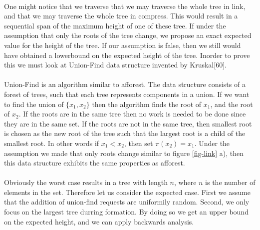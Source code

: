 \documentclass[]{article}
\begin{document}
 \paragraph{}
 One might notice that we traverse that we may traverse the whole tree in link, and that we may traverse the whole tree in compress.
 This would result in a sequential span of the maximum height of one of these tree. If under the assumption that only the roots of the tree change, we propose an exact expected value for the height of the tree. If our assumption is false, then we still would have obtained a lowerbound on the expected height of the tree. Inorder to prove this we must look at Union-Find data structure invented by Kruskal[60].
 
 \paragraph{}
 Union-Find is an algorithm similar to afforest. The data structure consists of a forest of trees, such that each tree represents components in a union. If we want to find the union of $\{x_1,x_2\}$ then the algorithm finds the root of $x_1$, and the root of $x_2$.
 If the roots are in the same tree then no work is needed to be done since they are in the same set. If the roots are not in the same tree, then smallest root is chosen as the new root of the tree such that the largest root is a child of the smallest root. In other words if $x_1 < x_2$, then set $\pi(x_2) = x_1$. Under the assumption we made that only roots change similar to figure \ref{fig-link} a), then this data structure exhibits the same properties as afforest.
 
 \paragraph{}
 Obviously the worst case results in a tree with length $n$, where $n$ is the number of elements in the set. Therefore let us consider the expected case. First we assume that the addition of union-find requests are uniformily random. Second, we only focus on the largest tree durring formation. By doing so we get an upper bound on the expected height, and we can apply backwards analysis. 
\end{document}

